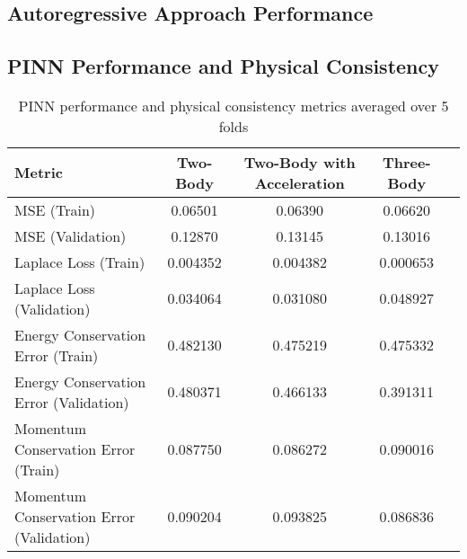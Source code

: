 \documentclass[12pt,a4paper]{article}
\begin{document}
\subsection{Autoregressive Approach Performance}


\subsection{PINN Performance and Physical Consistency}

\begin{table}[h]
  \centering
  \begin{tabular}{lcccc}
      \hline
      Metric & Two-Body & Two-Body with Acceleration & Three-Body \\
      \hline
      MSE (Train) & 0.06501 & 0.06390 & 0.06620 \\
      MSE (Validation) & 0.12870 & 0.13145 & 0.13016 \\
      Laplace Loss (Train) & 0.004352 & 0.004382 & 0.000653 \\
      Laplace Loss (Validation) & 0.034064 & 0.031080 & 0.048927 \\
      Energy Conservation Error (Train) & 0.482130 & 0.475219 & 0.475332 \\
      Energy Conservation Error (Validation) & 0.480371 & 0.466133 & 0.391311 \\
      Momentum Conservation Error (Train) & 0.087750 & 0.086272 & 0.090016 \\
      Momentum Conservation Error (Validation) & 0.090204 & 0.093825 & 0.086836 \\
      \hline
  \end{tabular}
  \caption{PINN performance and physical consistency metrics averaged over 5 folds}
  \label{tab:pinn_performance}
\end{table}

\end{document}
